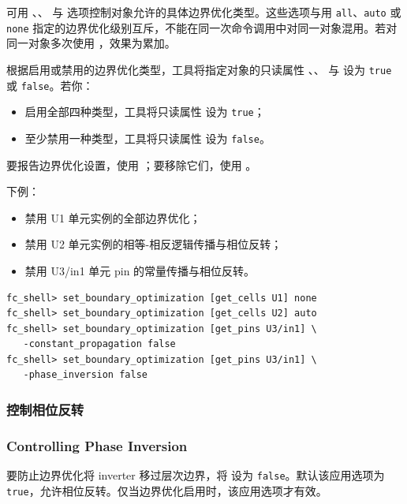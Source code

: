 可用 、、 与  选项控制对象允许的具体边界优化类型。这些选项与用 \texttt{all}、\texttt{auto} 或 \texttt{none} 指定的边界优化级别互斥，不能在同一次命令调用中对同一对象混用。若对同一对象多次使用 ，效果为累加。

根据启用或禁用的边界优化类型，工具将指定对象的只读属性 、、 与  设为 \texttt{true} 或 \texttt{false}。若你：
\begin{itemize}
  \item 启用全部四种类型，工具将只读属性  设为 \texttt{true}；
  \item 至少禁用一种类型，工具将只读属性  设为 \texttt{false}。
\end{itemize}

要报告边界优化设置，使用 ；要移除它们，使用 。

下例：
\begin{itemize}
  \item 禁用 U1 单元实例的全部边界优化；
  \item 禁用 U2 单元实例的相等-相反逻辑传播与相位反转；
  \item 禁用 U3/in1 单元 pin 的常量传播与相位反转。
\end{itemize}
\begin{lstlisting}
fc_shell> set_boundary_optimization [get_cells U1] none
fc_shell> set_boundary_optimization [get_cells U2] auto
fc_shell> set_boundary_optimization [get_pins U3/in1] \
   -constant_propagation false
fc_shell> set_boundary_optimization [get_pins U3/in1] \
   -phase_inversion false
\end{lstlisting}

\subsubsection{控制相位反转}
\subsubsection*{Controlling Phase Inversion}

要防止边界优化将 inverter 移过层次边界，将  设为 \texttt{false}。默认该应用选项为 \texttt{true}，允许相位反转。仅当边界优化启用时，该应用选项才有效。

